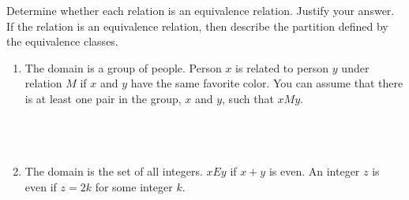 \documentclass{amsart}
\theoremstyle{definition}
\theoremstyle{Exercise}
\theoremstyle{remark}
\theoremstyle{rule}
\numberwithin{equation}{section}
\begin{document}
Determine whether each relation is an equivalence relation. Justify your answer. If the relation is an equivalence relation, then describe the partition defined by the equivalence classes.\\
\begin{enumerate}[label=(\alph*)]
\item The domain is a group of people. Person $x$ is related to person $y$ under relation $M$ if $x$ and $y$ have the same favorite color. You can assume that there is at least one pair in the group, $x$ and $y$, such that $xMy$.\\\\
\\\\

\item The domain is the set of all integers. $xEy$ if $x + y$ is even. An integer $z$ is even if $z = 2k$ for some integer $k$.\\\\
\\\\

\end{enumerate}
\end{document}

